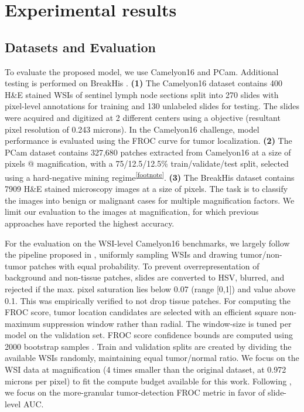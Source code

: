 \documentclass{llncs}
\newcommand{\citet}[1]{\cite{#1}}
\begin{document}
\section{Experimental results}
\subsection{Datasets and Evaluation}\label{ssec:data_eval}
To evaluate the proposed model, we use Camelyon16 \cite{Ehteshami_Bejnordi2017-pt} and PCam. Additional testing is performed on BreakHis \cite{Spanhol2016-dm}. \textbf{(1)} The Camelyon16  dataset contains 400 H\&E stained WSIs of sentinel lymph node sections split into 270 slides with pixel-level annotations for training and 130  unlabeled slides for testing.  The slides were acquired and digitized at 2 different centers  using a  objective (resultant pixel resolution of 0.243 microns). In the Camelyon16 challenge, model performance is evaluated using the FROC curve for tumor localization. \textbf{(2)}  The PCam dataset contains 327,680 patches extracted from Camelyon16 at a size of  pixels @  magnification, with a 75/12.5/12.5\% train/validate/test split, selected using a hard-negative mining regime\textsuperscript{\ref{footnote}}.
\textbf{(3)} The BreakHis dataset contains 7909 H\&E stained microscopy images at a size of  pixels.  The task is to classify the images into benign or malignant cases for multiple magnification factors. We limit our evaluation to the images at  magnification, for which previous approaches \cite{Spanhol2016-dm,Songyang} have reported the highest accuracy.


For the evaluation on the WSI-level Camelyon16 benchmarks, we largely follow the pipeline proposed in \citet{Liu2017-jq}, uniformly sampling WSIs and drawing tumor/non-tumor patches with equal probability. To prevent overrepresentation of background  and non-tissue patches, slides are converted to HSV, blurred, and rejected if the max. pixel saturation lies below 0.07 (range [0,1]) and value above 0.1. This was empirically verified to not drop tissue patches. For computing the FROC score, tumor location candidates are selected with an efficient square non-maximum suppression window rather than radial. The window-size is tuned per model on the validation set. FROC score confidence bounds are computed using 2000 bootstrap samples \citet{Liu2017-jq}. Train and validation splits are created by dividing the available WSIs randomly, maintaining equal tumor/normal ratio. We focus on the WSI data at   magnification (4 times smaller than the original dataset, at 0.972 microns per pixel) to fit the compute budget available for this work. Following \cite{Liu2017-jq}, we focus on the more-granular tumor-detection FROC metric in favor of slide-level AUC.
\end{document}

